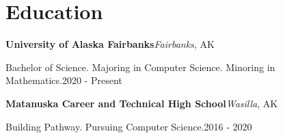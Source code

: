 ﻿\section{Education}

{\textbf{University of Alaska Fairbanks}}\hfill{\textit{Fairbanks}, AK}

{Bachelor of Science. Majoring in Computer Science. Minoring in Mathematics.}\hfill{2020 - Present}

\bigbreak

{\textbf{Matanuska Career and Technical High School}}\hfill{\textit{Wasilla}, AK}

{Building Pathway. Pursuing Computer Science.}\hfill{2016 - 2020}
